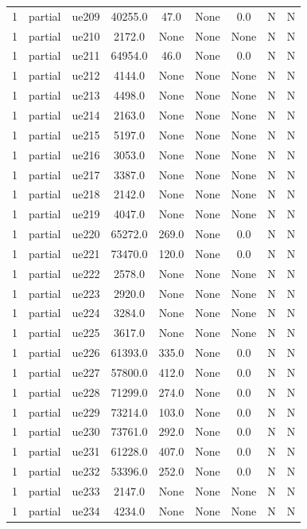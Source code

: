 \begin{table}[ht]
\begin{tabular}{|c|c|c|c|c|c|c|c|c|}
1 & partial & ue209 & 40255.0 & 47.0 & None & 0.0 & N & N \\
1 & partial & ue210 & 2172.0 & None & None & None & N & N \\
1 & partial & ue211 & 64954.0 & 46.0 & None & 0.0 & N & N \\
1 & partial & ue212 & 4144.0 & None & None & None & N & N \\
1 & partial & ue213 & 4498.0 & None & None & None & N & N \\
1 & partial & ue214 & 2163.0 & None & None & None & N & N \\
1 & partial & ue215 & 5197.0 & None & None & None & N & N \\
1 & partial & ue216 & 3053.0 & None & None & None & N & N \\
1 & partial & ue217 & 3387.0 & None & None & None & N & N \\
1 & partial & ue218 & 2142.0 & None & None & None & N & N \\
1 & partial & ue219 & 4047.0 & None & None & None & N & N \\
1 & partial & ue220 & 65272.0 & 269.0 & None & 0.0 & N & N \\
1 & partial & ue221 & 73470.0 & 120.0 & None & 0.0 & N & N \\
1 & partial & ue222 & 2578.0 & None & None & None & N & N \\
1 & partial & ue223 & 2920.0 & None & None & None & N & N \\
1 & partial & ue224 & 3284.0 & None & None & None & N & N \\
1 & partial & ue225 & 3617.0 & None & None & None & N & N \\
1 & partial & ue226 & 61393.0 & 335.0 & None & 0.0 & N & N \\
1 & partial & ue227 & 57800.0 & 412.0 & None & 0.0 & N & N \\
1 & partial & ue228 & 71299.0 & 274.0 & None & 0.0 & N & N \\
1 & partial & ue229 & 73214.0 & 103.0 & None & 0.0 & N & N \\
1 & partial & ue230 & 73761.0 & 292.0 & None & 0.0 & N & N \\
1 & partial & ue231 & 61228.0 & 407.0 & None & 0.0 & N & N \\
1 & partial & ue232 & 53396.0 & 252.0 & None & 0.0 & N & N \\
1 & partial & ue233 & 2147.0 & None & None & None & N & N \\
1 & partial & ue234 & 4234.0 & None & None & None & N & N \\

\end{tabular}
\end{table}
